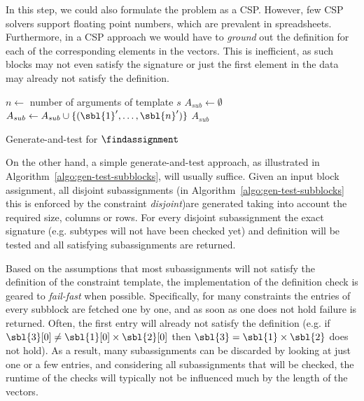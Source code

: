 In this step, we could also formulate the problem as a CSP. %
However, few CSP solvers support floating point numbers, which are prevalent in spreadsheets.
Furthermore, in a CSP approach we would have to \textit{ground} out the definition for each of the corresponding elements in the vectors.
This is inefficient, as such blocks may not even satisfy the signature or just the first element in the data may already not satisfy the definition.

\begin{algorithm}[tbh]
  \begin{algorithmic}
    \footnotesize
    \State $n \gets$ number of arguments of template $s$
    \State $A_{sub} \gets \emptyset$
        \State $A_{sub} \gets A_{sub} \cup \{ (\sbl{1}', \dots, \sbl{n}') \}$
      \EndIf
    \EndFor
\Return $A_{sub}$
\EndProcedure
\end{algorithmic}
\caption{Generate-and-test for $\findassignment$}
\label{algo:gen-test-subblocks}
\end{algorithm}


On the other hand, a simple generate-and-test approach, as illustrated in Algorithm~\ref{algo:gen-test-subblocks}, will usually suffice.
Given an input block assignment, all disjoint subassignments \pubrev(in Algorithm~\ref{algo:gen-test-subblocks} this is enforced by the constraint \textit{disjoint})\pubrevend are generated taking into account the required size, columns or rows.
For every disjoint subassignment the exact signature (e.g. subtypes will not have been checked yet) and definition will be tested and all satisfying subassignments are returned.


Based on the assumptions that most subassignments will not satisfy the definition of the constraint template, the implementation of the definition check is geared to \textit{fail-fast} when possible.
Specifically, for many constraints the entries of every subblock are fetched one by one, and as soon as one does not hold failure is returned.
Often, the first entry will already not satisfy the definition (e.g. if $\sbl{3}[0] \neq \sbl{1}[0] \times \sbl{2}[0]$ then $\sbl{3} = \sbl{1} \times \sbl{2}$ does not hold).
As a result, many subassignments can be discarded by looking at just one or a few entries, and considering all subassignments that will be checked, the runtime of the checks will typically not be influenced much by the length of the vectors.



